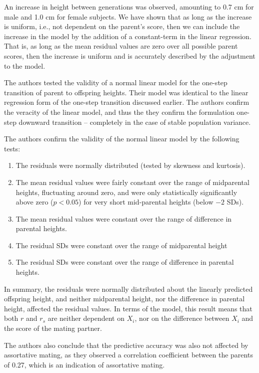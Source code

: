 \documentclass[letterpaper,10pt]{article} %
\begin{document}
An increase in height between generations was observed, amounting to 0.7 cm for male and 1.0 cm for female subjects. We have shown that as long as the increase is uniform, i.e., not dependent on the parent's score, then we can include the increase in the model by the addition of a constant-term in the linear regression. That is, as long as the mean residual values are zero over all possible parent scores, then the increase is uniform and is accurately described by the adjustment to the model.

The authors tested the validity of a normal linear model for the one-step transition of parent to offspring heights. Their model was identical to the linear regression form of the one-step transition discussed earlier. The authors confirm the veracity of the linear model, and thus the they confirm the formulation one-step downward transition -- completely in the case of stable population variance.

The authors confirm the validity of the normal linear model by the following tests:
\begin{enumerate}
\item The residuals were normally distributed (tested by skewness and kurtosis).
\item The mean residual values were fairly constant over the range of midparental heights, fluctuating around zero, and were only statistically significantly above zero ($p < 0.05$) for very short mid-parental heights (below $-2$ SDs).
\item The mean residual values were constant over the range of difference in parental heights.
\item The residual SDs were constant over the range of midparental height  
\item The residual SDs were constant over the range of difference in parental heights.
\end{enumerate}

In summary, the residuals were normally distributed about the linearly predicted offspring height, and neither midparental height, nor the difference in parental height, affected the residual values. In terms of the model, this result means that both $r$ and $r_s$ are neither dependent on $X_i$, nor on the difference between $X_i$ and the score of the mating partner. 

The authors also conclude that the predictive accuracy was also not affected by assortative mating, as they observed a correlation coefficient between the parents of 0.27, which is an indication of assortative mating.
\end{document}
